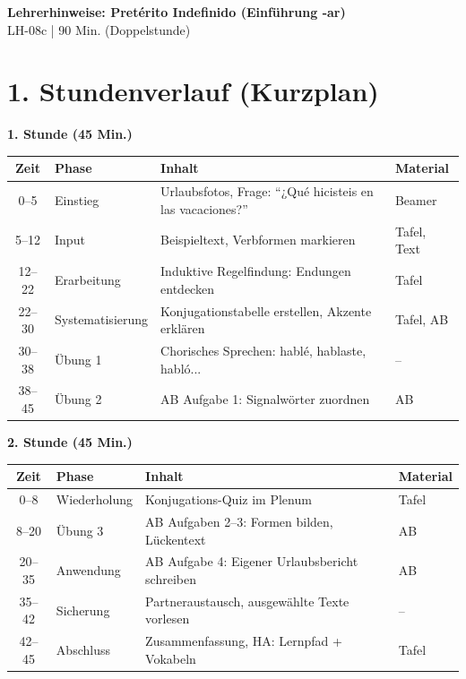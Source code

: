 \documentclass[11pt, a4paper]{article}
\newcommand{\fachfarbe}{spanisch}
\newcommand{\thema}{Pretérito Indefinido (Einführung -ar)}
\newcommand{\sequenz}{08}
\newcommand{\block}{c}
\newcommand{\dauer}{90 Min. (Doppelstunde)}
\begin{document}

\begin{center}
    {\Large\bfseries\textcolor{\fachfarbe}{Lehrerhinweise: \thema}}\\[0.3em]
    {\normalsize LH-\sequenz\block{} | \dauer}
\end{center}

\vspace{10pt}


\section*{1. Stundenverlauf (Kurzplan)}

\textbf{1. Stunde (45 Min.)}

\begin{tabularx}{\textwidth}{|c|l|X|l|}
\hline
\textbf{Zeit} & \textbf{Phase} & \textbf{Inhalt} & \textbf{Material} \\
\hline
0--5 & Einstieg & Urlaubsfotos, Frage: ``¿Qué hicisteis en las vacaciones?'' & Beamer \\
\hline
5--12 & Input & Beispieltext, Verbformen markieren & Tafel, Text \\
\hline
12--22 & Erarbeitung & Induktive Regelfindung: Endungen entdecken & Tafel \\
\hline
22--30 & Systematisierung & Konjugationstabelle erstellen, Akzente erklären & Tafel, AB \\
\hline
30--38 & Übung 1 & Chorisches Sprechen: hablé, hablaste, habló... & -- \\
\hline
38--45 & Übung 2 & AB Aufgabe 1: Signalwörter zuordnen & AB \\
\hline
\end{tabularx}

\vspace{1em}

\textbf{2. Stunde (45 Min.)}

\begin{tabularx}{\textwidth}{|c|l|X|l|}
\hline
\textbf{Zeit} & \textbf{Phase} & \textbf{Inhalt} & \textbf{Material} \\
\hline
0--8 & Wiederholung & Konjugations-Quiz im Plenum & Tafel \\
\hline
8--20 & Übung 3 & AB Aufgaben 2--3: Formen bilden, Lückentext & AB \\
\hline
20--35 & Anwendung & AB Aufgabe 4: Eigener Urlaubsbericht schreiben & AB \\
\hline
35--42 & Sicherung & Partneraustausch, ausgewählte Texte vorlesen & -- \\
\hline
42--45 & Abschluss & Zusammenfassung, HA: Lernpfad + Vokabeln & Tafel \\
\hline
\end{tabularx}
\end{document}
